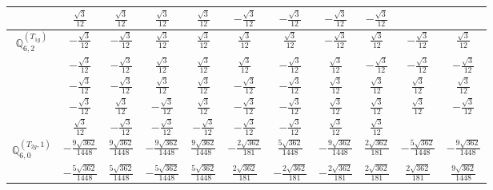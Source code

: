 \documentclass[fleqn,10pt,landscape]{article}
\begin{document}
\begin{itemize}
{\begin{center}
\begin{longtable}{ccccccccccc}
& $ \frac{\sqrt{3}}{12} $ & $ \frac{\sqrt{3}}{12} $ & $ \frac{\sqrt{3}}{12} $ & $ \frac{\sqrt{3}}{12} $ & $ - \frac{\sqrt{3}}{12} $ & $ - \frac{\sqrt{3}}{12} $ & $ - \frac{\sqrt{3}}{12} $ & $ - \frac{\sqrt{3}}{12} $ & $  $ & $  $ \\ \hline
$\mathbb{Q}_{6,2}^{(T_{1g})}$ & $ - \frac{\sqrt{3}}{12} $ & $ - \frac{\sqrt{3}}{12} $ & $ \frac{\sqrt{3}}{12} $ & $ \frac{\sqrt{3}}{12} $ & $ \frac{\sqrt{3}}{12} $ & $ \frac{\sqrt{3}}{12} $ & $ - \frac{\sqrt{3}}{12} $ & $ \frac{\sqrt{3}}{12} $ & $ - \frac{\sqrt{3}}{12} $ & $ \frac{\sqrt{3}}{12} $ \\
& $ - \frac{\sqrt{3}}{12} $ & $ - \frac{\sqrt{3}}{12} $ & $ \frac{\sqrt{3}}{12} $ & $ \frac{\sqrt{3}}{12} $ & $ \frac{\sqrt{3}}{12} $ & $ - \frac{\sqrt{3}}{12} $ & $ \frac{\sqrt{3}}{12} $ & $ - \frac{\sqrt{3}}{12} $ & $ - \frac{\sqrt{3}}{12} $ & $ - \frac{\sqrt{3}}{12} $ \\
& $ - \frac{\sqrt{3}}{12} $ & $ - \frac{\sqrt{3}}{12} $ & $ \frac{\sqrt{3}}{12} $ & $ \frac{\sqrt{3}}{12} $ & $ - \frac{\sqrt{3}}{12} $ & $ - \frac{\sqrt{3}}{12} $ & $ \frac{\sqrt{3}}{12} $ & $ \frac{\sqrt{3}}{12} $ & $ \frac{\sqrt{3}}{12} $ & $ \frac{\sqrt{3}}{12} $ \\
& $ - \frac{\sqrt{3}}{12} $ & $ \frac{\sqrt{3}}{12} $ & $ - \frac{\sqrt{3}}{12} $ & $ \frac{\sqrt{3}}{12} $ & $ - \frac{\sqrt{3}}{12} $ & $ - \frac{\sqrt{3}}{12} $ & $ \frac{\sqrt{3}}{12} $ & $ \frac{\sqrt{3}}{12} $ & $ \frac{\sqrt{3}}{12} $ & $ - \frac{\sqrt{3}}{12} $ \\
& $ \frac{\sqrt{3}}{12} $ & $ - \frac{\sqrt{3}}{12} $ & $ - \frac{\sqrt{3}}{12} $ & $ - \frac{\sqrt{3}}{12} $ & $ - \frac{\sqrt{3}}{12} $ & $ - \frac{\sqrt{3}}{12} $ & $ \frac{\sqrt{3}}{12} $ & $ \frac{\sqrt{3}}{12} $ & $  $ & $  $ \\ \hline
$\mathbb{Q}_{6,0}^{(T_{2g},1)}$ & $ - \frac{9 \sqrt{362}}{1448} $ & $ \frac{9 \sqrt{362}}{1448} $ & $ - \frac{9 \sqrt{362}}{1448} $ & $ \frac{9 \sqrt{362}}{1448} $ & $ - \frac{2 \sqrt{362}}{181} $ & $ \frac{5 \sqrt{362}}{1448} $ & $ - \frac{9 \sqrt{362}}{1448} $ & $ \frac{2 \sqrt{362}}{181} $ & $ - \frac{5 \sqrt{362}}{1448} $ & $ - \frac{9 \sqrt{362}}{1448} $ \\
& $ - \frac{5 \sqrt{362}}{1448} $ & $ \frac{5 \sqrt{362}}{1448} $ & $ - \frac{5 \sqrt{362}}{1448} $ & $ \frac{5 \sqrt{362}}{1448} $ & $ \frac{2 \sqrt{362}}{181} $ & $ - \frac{2 \sqrt{362}}{181} $ & $ - \frac{2 \sqrt{362}}{181} $ & $ \frac{2 \sqrt{362}}{181} $ & $ \frac{2 \sqrt{362}}{181} $ & $ \frac{9 \sqrt{362}}{1448} $ \\

\end{longtable}
\end{center}}
\end{itemize}
\end{document}

